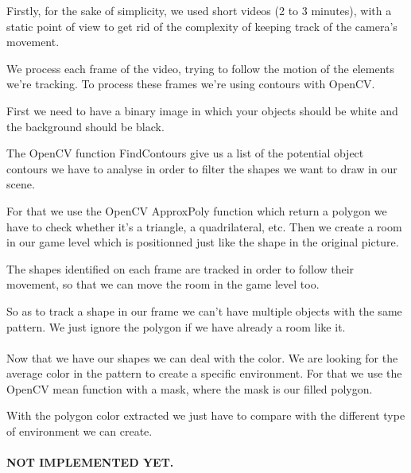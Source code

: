 \documentclass[landscape,final,a0paper,fontscale=0.285]{baposter}
\begin{document}
\begin{poster}
{  Firstly, for the sake of simplicity, we used short videos (2 to 3 minutes), with a static point of view to get rid of the complexity of keeping track of the camera's movement.
  
  We process each frame of the video, trying to follow the motion of the elements we're tracking. To process these frames we're using contours with OpenCV.

  First we need to have a binary image in which your objects should be white and the background should be black.
  
  The OpenCV function FindContours give us a list of the potential object contours we have to analyse in order to filter the shapes we want to draw in our scene.
  
  For that we use the OpenCV ApproxPoly function which return a polygon we have to check whether it's a triangle, a quadrilateral, etc. Then we create a room in our game level which is positionned just like the shape in the original picture.
  
  The shapes identified on each frame are tracked in order to follow their movement, so that we can move the room in the game level too.
  
  So as to track a shape in our frame we can't have multiple objects with the same pattern. We just ignore the polygon if we have already a room like it.
  \\
  \\
  \indent
  Now that we have our shapes we can deal with the color. We are looking for the average color in the pattern to create a specific environment. For that we use the OpenCV mean function with a mask, where the mask is our filled polygon.
  
  With the polygon color extracted we just have to compare with the different type of environment we can create.
  \\
  \\
  \indent
  \textbf{NOT IMPLEMENTED YET.}
  
   \vspace{0.3em}
  }


\end{poster}
\end{document}
